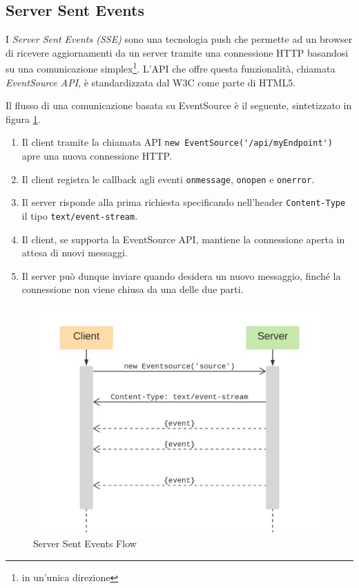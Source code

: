 \documentclass[12pt,a4paper,openright,twoside]{report}
\begin{document}
\subsection{Server Sent Events}
I \textit{Server Sent Events (SSE)} sono una tecnologia push che permette ad un browser di ricevere aggiornamenti da un server tramite una connessione HTTP basandosi su una comunicazione simplex\footnote{in un'unica direzione}. L'API che offre questa funzionalità, chiamata \textit{EventSource API}, è standardizzata dal W3C come parte di HTML5.

Il flusso di una comunicazione basata su EventSource è il seguente\cite{eventsource_api}, sintetizzato in figura \ref{fig:server_sent_events}.

\begin{enumerate}
  \item Il client tramite la chiamata API \lstinline{new EventSource('/api/myEndpoint')} apre una nuova connessione HTTP.
  \item Il client registra le callback agli eventi \lstinline{onmessage}, \lstinline{onopen} e \lstinline{onerror}.
  \item Il server risponde alla prima richiesta specificando nell'header \lstinline{Content-Type} il tipo \lstinline{text/event-stream}.
  \item Il client, se supporta la EventSource API, mantiene la connessione aperta in attesa di nuovi messaggi.
  \item Il server può dunque inviare quando desidera un nuovo messaggio, finché la connessione non viene chiusa da una delle due parti.
\end{enumerate}

\begin{figure}[!htbp]
\centering
\includegraphics[width=.6\textwidth]{assets/server_sent_events.png}
\caption{Server Sent Events Flow}
\label{fig:server_sent_events}
\end{figure}
\end{document}
